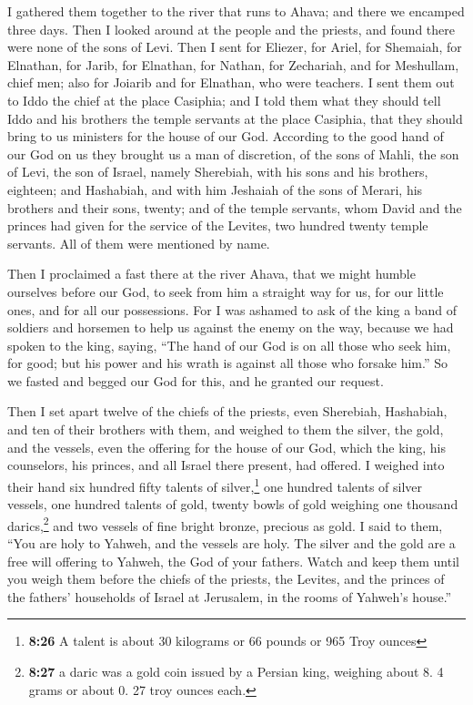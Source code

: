  I gathered them together to the river that runs to
Ahava; and there we encamped three days. Then I looked around at the
people and the priests, and found there were none of the sons of Levi.
 Then I sent for Eliezer, for Ariel, for Shemaiah, for
Elnathan, for Jarib, for Elnathan, for Nathan, for Zechariah, and for
Meshullam, chief men; also for Joiarib and for Elnathan, who were
teachers.  I sent them out to Iddo the chief at the place
Casiphia; and I told them what they should tell Iddo and his brothers
the temple servants at the place Casiphia, that they should bring to us
ministers for the house of our God.  According to the
good hand of our God on us they brought us a man of discretion, of the
sons of Mahli, the son of Levi, the son of Israel, namely Sherebiah,
with his sons and his brothers, eighteen;  and Hashabiah,
and with him Jeshaiah of the sons of Merari, his brothers and their
sons, twenty;  and of the temple servants, whom David and
the princes had given for the service of the Levites, two hundred twenty
temple servants. All of them were mentioned by name.

 Then I proclaimed a fast there at the river Ahava, that
we might humble ourselves before our God, to seek from him a straight
way for us, for our little ones, and for all our possessions.
 For I was ashamed to ask of the king a band of soldiers
and horsemen to help us against the enemy on the way, because we had
spoken to the king, saying, ``The hand of our God is on all those who
seek him, for good; but his power and his wrath is against all those who
forsake him.''  So we fasted and begged our God for this,
and he granted our request.

 Then I set apart twelve of the chiefs of the priests,
even Sherebiah, Hashabiah, and ten of their brothers with them,
 and weighed to them the silver, the gold, and the
vessels, even the offering for the house of our God, which the king, his
counselors, his princes, and all Israel there present, had offered.
 I weighed into their hand six hundred fifty talents of
silver,\footnote{\textbf{8:26} A talent is about 30 kilograms or 66
  pounds or 965 Troy ounces} one hundred talents of silver vessels, one
hundred talents of gold,  twenty bowls of gold weighing
one thousand darics,\footnote{\textbf{8:27} a daric was a gold coin
  issued by a Persian king, weighing about 8. 4 grams or about 0. 27
  troy ounces each.} and two vessels of fine bright bronze, precious as
gold.  I said to them, ``You are holy to Yahweh, and the
vessels are holy. The silver and the gold are a free will offering to
Yahweh, the God of your fathers.  Watch and keep them
until you weigh them before the chiefs of the priests, the Levites, and
the princes of the fathers' households of Israel at Jerusalem, in the
rooms of Yahweh's house.''

